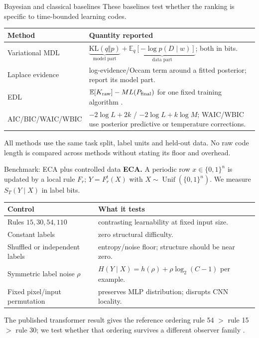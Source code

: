 \documentclass[aspectratio=43]{beamer}
\newcommand{\KL}{\mathrm{KL}}
\newcommand{\E}{\mathbb{E}}
\begin{document}
\begin{frame}{Bayesian and classical baselines}
These baselines test whether the ranking is specific to time-bounded learning codes.

\medskip
\begin{tabular}{p{.25\linewidth}p{.64\linewidth}}
\toprule
Method & Quantity reported \\
\midrule
Variational MDL & $\underbrace{\KL(q\Vert p)}_{\text{model part}}+
\underbrace{\E_q[-\log p(D\mid w)]}_{\text{data part}}$; both in bits. \\
Laplace evidence & log-evidence/Occam term around a fitted posterior; report its model part. \\
EDL & $\E[K_{\rm raw}]-M L(P_{\rm final})$ for one fixed training algorithm \citep{donoway2026}. \\
AIC/BIC/WAIC/WBIC & $-2\log L+2k$ / $-2\log L+k\log M$; WAIC/WBIC use posterior predictive or temperature corrections. \\
\bottomrule
\end{tabular}

\medskip
All methods use the same task split, label units and held-out data. No raw code length is compared
across methods without stating its floor and overhead.
\end{frame}

\begin{frame}{Benchmark: ECA plus controlled data}
\textbf{ECA.} A periodic row $x\in\{0,1\}^n$ is updated by a local rule $F_r$;
$Y=F_r^t(X)$ with $X\sim\operatorname{Unif}(\{0,1\}^n)$. We measure $S_T(Y\mid X)$ in label bits.

\medskip
\begin{tabular}{p{.26\linewidth}p{.58\linewidth}}
\toprule
Control & What it tests \\
\midrule
Rules $15,30,54,110$ & contrasting learnability at fixed input size. \\
Constant labels & zero structural difficulty. \\
Shuffled or independent labels & entropy/noise floor; structure should be near zero. \\
Symmetric label noise $\rho$ & $H(Y\mid X)=h(\rho)+\rho\log_2(C-1)$ per example. \\
Fixed pixel/input permutation & preserves MLP distribution; disrupts CNN locality. \\
\bottomrule
\end{tabular}

\medskip
The published transformer result gives the reference ordering rule 54 $>$ rule 15 $>$ rule 30;
we test whether that ordering survives a different observer family \citep{finzi2026}.
\end{frame}
\end{document}
